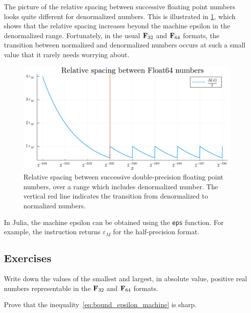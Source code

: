 The picture of the relative spacing between successive floating point numbers looks quite different for denormalized numbers.
This is illustrated in \cref{fig:float64_spacing_denormalized},
which shows that the relative spacing increases beyond the machine epsilon in the denormalized range.
Fortunately, in the usual $\mathbf F_{32}$ and $\mathbf F_{64}$ formats,
the transition between normalized and denormalized numbers occurs at such a small value that
it rarely needs worrying about.

\begin{figure}[ht]
    \centering
    \includegraphics[width=.8\textwidth]{figures/float64_spacing_denormalized.pdf}
    \caption{%
        Relative spacing between successive double-precision floating point numbers,
        over a range which includes denormalized number.
        The vertical red line indicates the transition from denormalized to normalized numbers.
    }%
    \label{fig:float64_spacing_denormalized}
\end{figure}

\begin{remark}
    In Julia,
    the machine epsilon can be obtained using the \texttt{eps} function.
    For example, the instruction  returns $\varepsilon_M$ for the half-precision format.
\end{remark}

\subsection{Exercises}%

\begin{exercise}
    Write down the values of the smallest and largest, in absolute value,
    positive real numbers representable in the $\mathbf F_{32}$ and $\mathbf F_{64}$ formats.
\end{exercise}

\begin{exercise}
    \label{exercise:machine_epsilon}
    Prove that the inequality~\eqref{eq:bound_epsilon_machine} is sharp.
\end{exercise}

